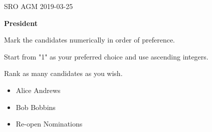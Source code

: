 \documentclass[14pt,onesided]{letter}
\def\option{\item[$\vcenter{\hbox{\Huge$\Box$}}$]}
\begin{document}
    \begin{center}
        \Huge{SRO AGM}
        \LARGE{2019-03-25}


        \Large{\textbf{President}}
    \end{center}

    Mark the candidates numerically in order of preference. 

    Start from "1" as your preferred choice and use ascending integers.

    Rank as many candidates as you wish.

    \begin{itemize}
        \option Alice Andrews
        \option Bob Bobbins
        \option Re-open Nominations
    \end{itemize}
\end{document}
